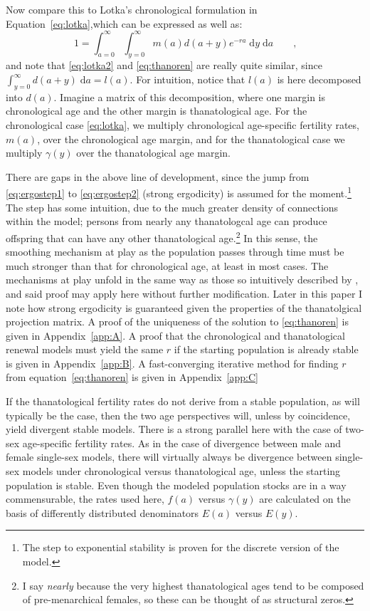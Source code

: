 \documentclass[12pt,oneside,a4paper,leqno]{article}
\newcommand{\dd}{\; \mathrm{d}}
\newcommand{\ec}{\quad\quad\text{,}}
\begin{document}
Now compare this to Lotka's chronological formulation in
Equation~\eqref{eq:lotka},which can be expressed as well as:
\begin{equation}
 1 = \int_{a=0}^\infty \int_{y=0}^\infty m(a)d(a+y)e^{-ra}\dd y \dd a \ec
  \label{eq:lotka2}
\end{equation}
and note that \eqref{eq:lotka2} and \eqref{eq:thanoren} are really quite
similar, since $\int _{y=0}^\infty d(a+y)\dd a = l(a)$. For intuition, notice
that $l(a)$ is here decomposed into $d(a)$. Imagine a matrix of this
decomposition, where one margin is chronological age and the other margin is
thanatological age.
For the chronological case \eqref{eq:lotka}, we multiply chronological
age-specific fertility rates, $m(a)$, over the chronological age margin, and for the thanatological case we multiply $\gamma(y)$ over the thanatological age margin.

There are gaps in the above line of development, since the jump from
\eqref{eq:ergostep1} to \eqref{eq:ergostep2} (strong ergodicity) is assumed for
the moment.\footnote{The step to exponential stability is proven
for the discrete version of the model.} The step has some intuition, due to
the much greater density of connections within the model; persons from nearly any
thanatologcal age can produce offspring that can have any other
thanatological age.\footnote{I say \textit{nearly} because the very highest thanatological ages tend to be composed of pre-menarchical females, so these can be thought of as structural
zeros.} In
this sense, the smoothing mechanism at play as the population passes through
time must be much stronger than that for chronological age, at least in most
cases. The mechanisms at play unfold in the same way
as those so intuitively described by \citet{arthur1982ergodic}, and said proof may apply here without
further modification. Later in this paper I note how strong ergodicity is
guaranteed given the properties of the thanatolgical projection matrix. A proof
of the uniqueness of the solution to \eqref{eq:thanoren} is given in
Appendix~\ref{app:A}. A proof that the chronological and thanatological renewal
models must yield the same $r$ if the starting population is already stable is
given in Appendix~\ref{app:B}. A fast-converging iterative method for finding
$r$ from equation~\eqref{eq:thanoren} is given in Appendix~\ref{app:C}

If the thanatological fertility rates do not derive from a stable
population, as will typically be the case, then the two age perspectives
will, unless by coincidence, yield divergent stable models. There is a strong
parallel here with the case of two-sex age-specific fertility rates. As in the
case of divergence between male and female single-sex models, there will
virtually always be divergence between single-sex models under chronological
versus thanatological age, unless the starting population is stable. Even though the modeled population stocks are in a way commensurable, the rates used here, $f(a)$ versus $\gamma(y)$ are calculated on the basis of differently distributed denominators $E(a)$ versus $E(y)$.
\end{document}
